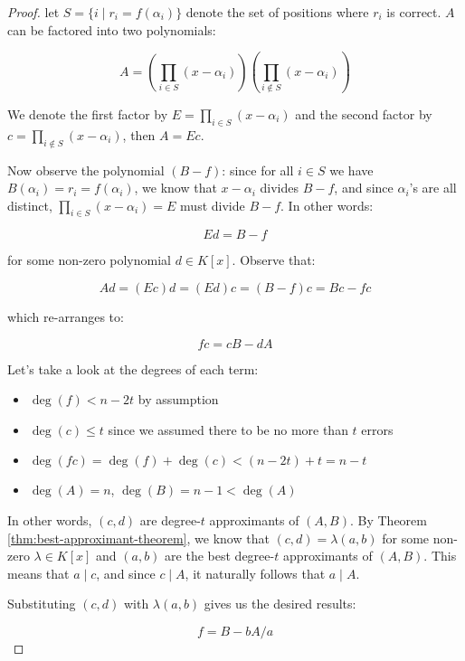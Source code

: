 \documentclass{article}
\begin{document}
\begin{proof}
    let $S = \{i \mid r_i = f(\alpha_i) \}$ denote the set of positions where $r_i$ is correct. $A$ can be factored into two polynomials:

    \begin{equation*}
        A = \left(\prod_{i\in S}(x - \alpha_i)\right)\left(\prod_{i\not\in S}(x - \alpha_i)\right)
    \end{equation*}

    We denote the first factor by $E = \prod_{i\in S}(x-\alpha_i)$ and the second factor by $c = \prod_{i\not\in S}(x-\alpha_i)$, then $A = Ec$.

    Now observe the polynomial $(B - f)$: since for all $i \in S$ we have $B(\alpha_i) = r_i = f(\alpha_i)$, we know that $x - \alpha_i$ divides $B - f$, and since $\alpha_i$'s are all distinct, $\prod_{i \in S}(x - \alpha_i) = E$ must divide $B - f$. In other words:

    \begin{equation*}
        Ed = B-f
    \end{equation*}

    for some non-zero polynomial $d \in K[x]$. Observe that:

    \begin{equation*}
    Ad = (Ec)d = (Ed)c = (B - f)c = Bc - fc
    \end{equation*}

    which re-arranges to:

    \begin{equation*}
    fc = cB-dA
    \end{equation*}

    Let's take a look at the degrees of each term: \begin{itemize}
        \item $\deg(f) < n - 2t$ by assumption
        \item $\deg(c) \leq t$ since we assumed there to be no more than $t$ errors
        \item $\deg(fc) = \deg(f) + \deg(c) < (n - 2t) + t = n - t$
        \item $\deg(A) = n$, $\deg(B) = n-1 < \deg(A)$
    \end{itemize}

    In other words, $(c, d)$ are degree-$t$ approximants of $(A, B)$. By Theorem \ref{thm:best-approximant-theorem}, we know that $(c, d) = \lambda(a, b)$ for some non-zero $\lambda \in K[x]$ and $(a, b)$ are the best degree-$t$ approximants of $(A, B)$. This means that $a \mid c$, and since $c \mid A$, it naturally follows that $a \mid A$.

    Substituting $(c, d)$ with $\lambda(a, b)$ gives us the desired results:

    \begin{equation*}
        f = B - bA/a
    \end{equation*}
\end{proof}
\end{document}
